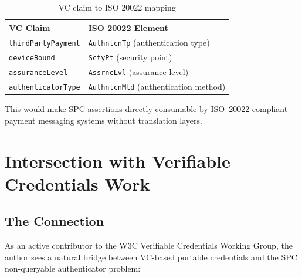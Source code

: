 \documentclass[12pt,a4paper]{article}
\begin{document}
\begin{table}[h]
\centering
\caption{VC claim to ISO 20022 mapping}
\label{tab:vc-iso20022}
\begin{tabularx}{\textwidth}{ll}
\toprule
\textbf{VC Claim} & \textbf{ISO 20022 Element} \\
\midrule
\texttt{thirdPartyPayment} & \texttt{AuthntcnTp} (authentication type) \\
\texttt{deviceBound} & \texttt{SctyPt} (security point) \\
\texttt{assuranceLevel} & \texttt{AssrncLvl} (assurance level) \\
\texttt{authenticatorType} & \texttt{AuthntcnMtd} (authentication method) \\
\bottomrule
\end{tabularx}
\end{table}

This would make SPC assertions directly consumable by ISO~20022-compliant payment messaging systems without translation layers.

\newpage
\section{Intersection with Verifiable Credentials Work}

\subsection{The Connection}

As an active contributor to the W3C Verifiable Credentials Working Group, the author sees a natural bridge between VC-based portable credentials and the SPC non-queryable authenticator problem:
\end{document}

